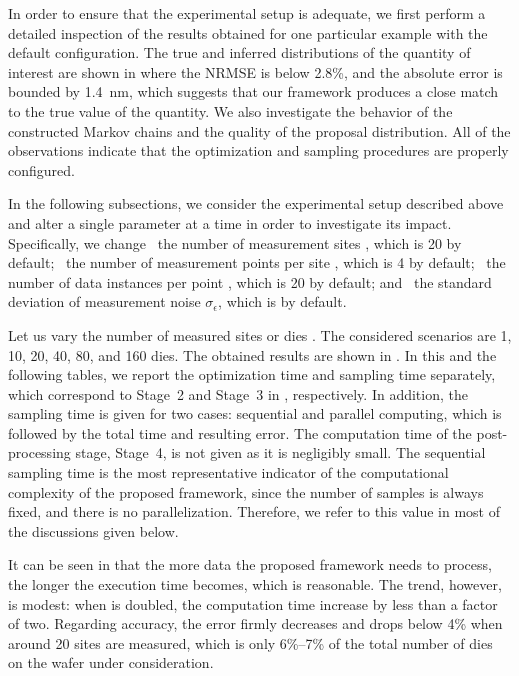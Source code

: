 In order to ensure that the experimental setup is adequate, we first perform a
detailed inspection of the results obtained for one particular example with the
default configuration. The true and inferred distributions of the quantity of
interest are shown in  where the \ac{NRMSE}
is below 2.8\%, and the absolute error is bounded by 1.4~nm, which suggests that
our framework produces a close match to the true value of the quantity. We also
investigate the behavior of the constructed Markov chains and the quality of the
proposal distribution. All of the observations indicate that the optimization
and sampling procedures are properly configured.

In the following subsections, we consider the experimental setup described above
and alter a single parameter at a time in order to investigate its impact.
Specifically, we change \one~the number of measurement sites \hnd, which is 20
by default; \two~the number of measurement points per site \np, which is 4 by
default; \three~the number of data instances per point \ns, which is 20 by
default; and \four~the standard deviation of measurement noise
$\sigma_\epsilon$, which is  by default.


Let us vary the number of measured sites or dies \hnd. The considered scenarios
are 1, 10, 20, 40, 80, and 160 dies. The obtained results are shown in
. In this and the following tables, we report the optimization
time and sampling time separately, which correspond to Stage~2 and Stage~3 in
, respectively. In addition, the sampling time is given for
two cases: sequential and parallel computing, which is followed by the total
time and resulting error. The computation time of the post-processing stage,
Stage~4, is not given as it is negligibly small. The sequential sampling time is
the most representative indicator of the computational complexity of the
proposed framework, since the number of samples is always fixed, and there is no
parallelization. Therefore, we refer to this value in most of the discussions
given below.

It can be seen in  that the more data the proposed framework
needs to process, the longer the execution time becomes, which is reasonable.
The trend, however, is modest: when \hnd is doubled, the computation time
increase by less than a factor of two. Regarding accuracy, the error firmly
decreases and drops below 4\% when around 20 sites are measured, which is only
6\%--7\% of the total number of dies on the wafer under consideration.

